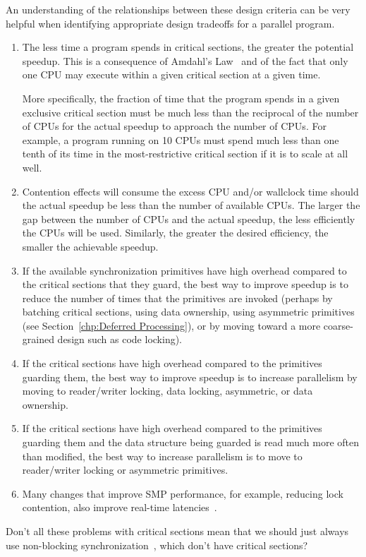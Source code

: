 An understanding of the relationships between these design criteria can
be very helpful when identifying appropriate design tradeoffs for a
parallel program.
\begin{enumerate}
\item	The less time a program spends in critical sections,
	the greater the potential speedup.
	This is a consequence of Amdahl's Law~\cite{GeneAmdahl1967AmdahlsLaw}
	and of the fact that only one CPU may execute within a given
	critical section at a given time.

	More specifically, the fraction of time that the program spends in
	a given exclusive critical section must be much less than
	the reciprocal of the number of CPUs for the
	actual speedup to approach the number of CPUs.
	For example, a program running on 10 CPUs must spend
	much less than one tenth of its time in the most-restrictive
	critical section if it is to scale at all well.
\item	Contention effects will consume the excess CPU and/or
	wallclock time should the actual speedup be less than
	the number of available CPUs.  The
	larger the gap between the number of CPUs
	and the actual speedup, the less efficiently the
	CPUs will be used.
	Similarly, the greater the desired efficiency, the smaller
	the achievable speedup.
\item	If the available synchronization primitives have
	high overhead compared to the critical sections
	that they guard, the best way to improve speedup
	is to reduce the number of times that the primitives
	are invoked (perhaps by batching critical sections,
	using data ownership, using asymmetric primitives
	(see Section~\ref{chp:Deferred Processing}),
	or by moving toward a more coarse-grained design
	such as code locking).
\item	If the critical sections have high overhead compared
	to the primitives guarding them, the best way
	to improve speedup is to increase parallelism
	by moving to reader/writer locking, data locking, asymmetric,
	or data ownership.
\item	If the critical sections have high overhead compared
	to the primitives guarding them and the data structure
	being guarded is read much more often than modified,
	the best way to increase parallelism is to move
	to reader/writer locking or asymmetric primitives.
\item	Many changes that improve SMP performance, for example,
	reducing lock contention, also improve real-time
	latencies~\cite{PaulMcKenney2005h}.
\end{enumerate}

\QuickQuiz{}
	Don't all these problems with critical sections mean that
	we should just always use
	non-blocking synchronization~\cite{MauriceHerlihy90a},
	which don't have critical sections?
 \QuickQuizEnd
